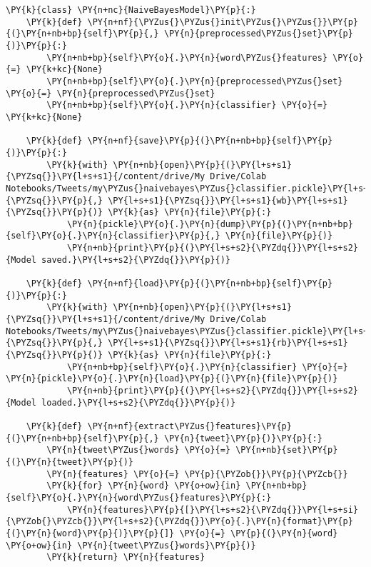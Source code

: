 \documentclass[11pt]{article}
\begin{document}
    \begin{tcolorbox}[breakable, size=fbox, boxrule=1pt, pad at break*=1mm,colback=cellbackground, colframe=cellborder]
\begin{Verbatim}[commandchars=\\\{\}]
\PY{k}{class} \PY{n+nc}{NaiveBayesModel}\PY{p}{:}
    \PY{k}{def} \PY{n+nf}{\PYZus{}\PYZus{}init\PYZus{}\PYZus{}}\PY{p}{(}\PY{n+nb+bp}{self}\PY{p}{,} \PY{n}{preprocessed\PYZus{}set}\PY{p}{)}\PY{p}{:}
        \PY{n+nb+bp}{self}\PY{o}{.}\PY{n}{word\PYZus{}features} \PY{o}{=} \PY{k+kc}{None}
        \PY{n+nb+bp}{self}\PY{o}{.}\PY{n}{preprocessed\PYZus{}set} \PY{o}{=} \PY{n}{preprocessed\PYZus{}set}
        \PY{n+nb+bp}{self}\PY{o}{.}\PY{n}{classifier} \PY{o}{=} \PY{k+kc}{None}

    \PY{k}{def} \PY{n+nf}{save}\PY{p}{(}\PY{n+nb+bp}{self}\PY{p}{)}\PY{p}{:}
        \PY{k}{with} \PY{n+nb}{open}\PY{p}{(}\PY{l+s+s1}{\PYZsq{}}\PY{l+s+s1}{/content/drive/My Drive/Colab Notebooks/Tweets/my\PYZus{}naivebayes\PYZus{}classifier.pickle}\PY{l+s+s1}{\PYZsq{}}\PY{p}{,} \PY{l+s+s1}{\PYZsq{}}\PY{l+s+s1}{wb}\PY{l+s+s1}{\PYZsq{}}\PY{p}{)} \PY{k}{as} \PY{n}{file}\PY{p}{:}
            \PY{n}{pickle}\PY{o}{.}\PY{n}{dump}\PY{p}{(}\PY{n+nb+bp}{self}\PY{o}{.}\PY{n}{classifier}\PY{p}{,} \PY{n}{file}\PY{p}{)}
            \PY{n+nb}{print}\PY{p}{(}\PY{l+s+s2}{\PYZdq{}}\PY{l+s+s2}{Model saved.}\PY{l+s+s2}{\PYZdq{}}\PY{p}{)}

    \PY{k}{def} \PY{n+nf}{load}\PY{p}{(}\PY{n+nb+bp}{self}\PY{p}{)}\PY{p}{:}
        \PY{k}{with} \PY{n+nb}{open}\PY{p}{(}\PY{l+s+s1}{\PYZsq{}}\PY{l+s+s1}{/content/drive/My Drive/Colab Notebooks/Tweets/my\PYZus{}naivebayes\PYZus{}classifier.pickle}\PY{l+s+s1}{\PYZsq{}}\PY{p}{,} \PY{l+s+s1}{\PYZsq{}}\PY{l+s+s1}{rb}\PY{l+s+s1}{\PYZsq{}}\PY{p}{)} \PY{k}{as} \PY{n}{file}\PY{p}{:}
            \PY{n+nb+bp}{self}\PY{o}{.}\PY{n}{classifier} \PY{o}{=} \PY{n}{pickle}\PY{o}{.}\PY{n}{load}\PY{p}{(}\PY{n}{file}\PY{p}{)}
            \PY{n+nb}{print}\PY{p}{(}\PY{l+s+s2}{\PYZdq{}}\PY{l+s+s2}{Model loaded.}\PY{l+s+s2}{\PYZdq{}}\PY{p}{)}

    \PY{k}{def} \PY{n+nf}{extract\PYZus{}features}\PY{p}{(}\PY{n+nb+bp}{self}\PY{p}{,} \PY{n}{tweet}\PY{p}{)}\PY{p}{:}
        \PY{n}{tweet\PYZus{}words} \PY{o}{=} \PY{n+nb}{set}\PY{p}{(}\PY{n}{tweet}\PY{p}{)}
        \PY{n}{features} \PY{o}{=} \PY{p}{\PYZob{}}\PY{p}{\PYZcb{}}
        \PY{k}{for} \PY{n}{word} \PY{o+ow}{in} \PY{n+nb+bp}{self}\PY{o}{.}\PY{n}{word\PYZus{}features}\PY{p}{:}
            \PY{n}{features}\PY{p}{[}\PY{l+s+s2}{\PYZdq{}}\PY{l+s+si}{\PYZob{}\PYZcb{}}\PY{l+s+s2}{\PYZdq{}}\PY{o}{.}\PY{n}{format}\PY{p}{(}\PY{n}{word}\PY{p}{)}\PY{p}{]} \PY{o}{=} \PY{p}{(}\PY{n}{word} \PY{o+ow}{in} \PY{n}{tweet\PYZus{}words}\PY{p}{)}
        \PY{k}{return} \PY{n}{features}


\end{Verbatim}
\end{tcolorbox}
\end{document}
